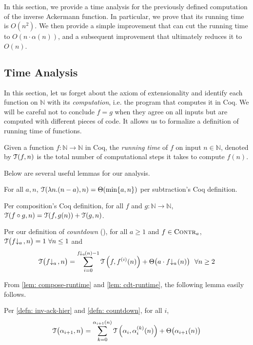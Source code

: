 In this section, we provide a time analysis for the previously defined computation of the inverse Ackermann function. In particular, we prove that its running time is $O(n^2)$. We then provide a simple improvement that can cut the running time to $O(n\cdot\alpha(n))$, and a subsequent improvement that ultimately reduces it to $O(n)$.
\subsection{Time Analysis}
In this section, let us forget about the axiom of extensionality and identify each function on $\mathbb{N}$ with its \emph{computation}, i.e. the program that computes it in Coq. We will be careful not to conclude $f = g$ when they agree on all inputs but are computed with different pieces of code. It allows us to formalize a definition of running time of functions.
\begin{defn}
	Given a function $f:\mathbb{N}\to\mathbb{N}$ in Coq, the \emph{running time} of $f$ on input $n\in \mathbb{N}$, denoted by $\mathcal{T}(f, n)$ is the total number of computational steps it takes to compute $f(n)$.
\end{defn}
Below are several useful lemmas for our analysis.
\begin{lem} \label{lem: sub-runtime}
	For all $a, n$, $\mathcal{T}(\lambda n.(n - a), n) = \Theta(\min\{a, n\})$ per subtraction's Coq definition.
\end{lem}
\begin{lem} \label{lem: compose-runtime}
	Per composition's Coq definition, for all $f$ and $g: \mathbb{N}\to \mathbb{N}$, $\mathcal{T}(f\circ g, n) = \mathcal{T}(f, g(n)) + \mathcal{T}(g, n)$.
\end{lem}
\begin{lem} \label{lem: cdt-runtime}
	Per our definition of \emph{countdown} (), for all $a\ge 1$ and $f\in \text{\scshape{Contr}}_{a}$, $\runtime\big(\cdt{f}{a}\ , n\big) = 1 \ \forall n\le 1$ and
	\begin{equation*}
	\runtime\big(\cdt{f}{a}\ , n\big) = \sum_{i=0}^{\cdt{f}{a}(n) - 1} \runtime\left(f, f^{(i)}(n)\right) + \Theta\big(a\cdot \cdt{f}{a}(n)\big) \ \ \forall n\ge 2
	\end{equation*}
\end{lem}
From \cref{lem: compose-runtime} and \cref{lem: cdt-runtime}, the following lemma easily follows.
\begin{lem} \label{lem: inv-ack-hier-runtime}
	Per \cref{defn: inv-ack-hier} and \cref{defn: countdown}, for all $i$, 
	\begin{equation*}
	\mathcal{T}\big(\alpha_{i+1}, n\big) = \sum_{k=0}^{\alpha_{i+1}(n)}\mathcal{T}\left(\alpha_i, \alpha_i^{(k)}(n)\right) + \Theta\big(\alpha_{i+1}(n)\big)
	\end{equation*}
\end{lem}
